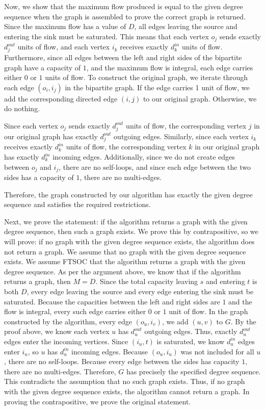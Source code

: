 \documentclass[11pt]{article}
\begin{document}
\begin{enumerate}
Now, we show that the maximum flow produced is equal to the given degree sequence when the graph is assembled to prove the correct graph is returned. 
Since the maximum flow has a value of $D$, all edges leaving the source and entering the sink must be saturated. 
This means that each vertex $o_j$ sends exactly $d_j^{out}$ units of flow, and each vertex $i_k$ receives exactly $d_k^{in}$ units of flow. 
Furthermore, since all edges between the left and right sides of the bipartite graph have a capacity of $1$, and the maximum flow is integral, 
each edge carries either $0$ or $1$ units of flow. To construct the original graph, we iterate through each edge $(o_i, i_j)$ in the bipartite graph. 
If the edge carries 1 unit of flow, we add the corresponding directed edge $(i, j)$ to our original graph. Otherwise, we do nothing.

Since each vertex $o_j$ sends exactly $d_j^{out}$ units of flow, the corresponding vertex $j$ in our original graph has exactly $d_j^{out}$ outgoing edges. 
Similarly, since each vertex $i_k$ receives exactly $d_k^{in}$ units of flow, the corresponding vertex $k$ in our original graph has 
exactly $d_k^{in}$ incoming edges. Additionally, since we do not create edges between $o_j$ and $i_j$, there are no self-loops, 
and since each edge between the two sides has a capacity of $1$, there are no multi-edges.

Therefore, the graph constructed by our algorithm has exactly the given degree sequence and satisfies the required restrictions.

\medbreak

Next, we prove the statement: if the algorithm returns a graph with the given degree sequence, then such a graph exists. 
We prove this by contrapositive, so we will prove: if no graph with the given degree sequence exists, the algorithm does not return a graph. 
We assume that no graph with the given degree sequence exists. We assume FTSOC that the algorithm returns a graph with the given degree sequence. 
As per the argument above, we know that if the algorithm returns a graph, then $M = D$. Since the total capacity leaving $s$ and entering $t$ is both $D$, 
every edge leaving the source and every edge entering the sink must be saturated. Because the capacities between the left and right sides 
are $1$ and the flow is integral, every such edge carries either $0$ or $1$ unit of flow. In the graph constructed by the algorithm, 
every edge $(o_u, i_v)$, we add $(u, v)$ to $G$. By the proof above, we know each vertex $u$ has $d_u^{out}$ outgoing edges. 
Thus, exactly $d_u^{out}$ edges enter the incoming vertices. Since $(i_u, t)$ is saturated, we know $d_u^{in}$ edges enter $i_u$, 
so $u$ has $d_u^{in}$ incoming edges. Because $(o_u, i_u)$ was not included for all $u$, there are no self-loops. 
Because every edge between the sides has capacity $1$, there are no multi-edges. Therefore, $G$ has precisely the specified degree sequence. 
This contradicts the assumption that no such graph exists. Thus, if no graph with the given degree sequence exists, the algorithm cannot return a graph.
In proving the contrapositive, we prove the original statement.


\end{enumerate}
\end{document}
